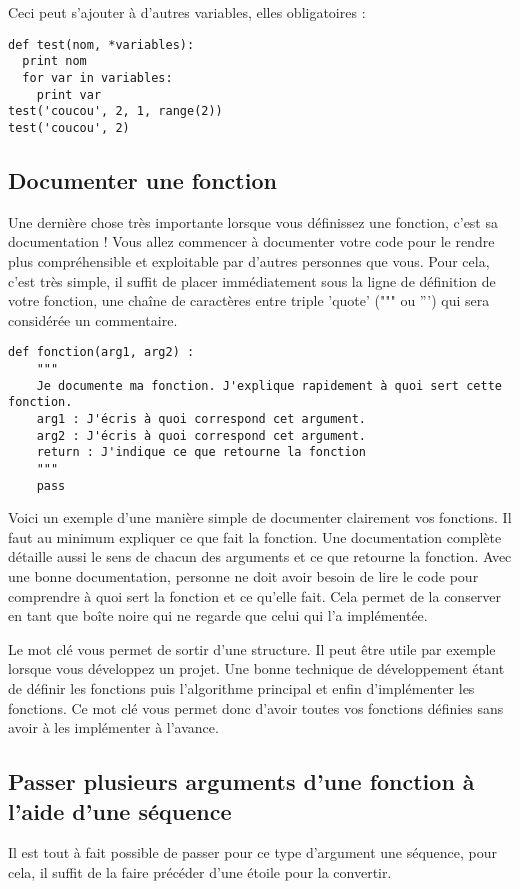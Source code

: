 \documentclass[a4paper,twoside]{article}
\begin{document}
Ceci peut s'ajouter à d'autres variables, elles obligatoires :
\begin{verbatim}
def test(nom, *variables):
  print nom
  for var in variables:
    print var
test('coucou', 2, 1, range(2))
test('coucou', 2)
\end{verbatim}

\subsection{Documenter une fonction}

Une dernière chose très importante lorsque vous définissez une fonction, c'est sa documentation ! Vous allez commencer à documenter votre code pour le rendre plus compréhensible et exploitable par d'autres personnes que vous. Pour cela, c'est très simple, il suffit de placer immédiatement sous la ligne de définition de votre fonction, une chaîne de caractères entre triple 'quote' (""" ou ''') qui sera considérée un commentaire.

\begin{verbatim}
def fonction(arg1, arg2) :
    """
    Je documente ma fonction. J'explique rapidement à quoi sert cette fonction.
    arg1 : J'écris à quoi correspond cet argument.
    arg2 : J'écris à quoi correspond cet argument.
    return : J'indique ce que retourne la fonction
    """
    pass
\end{verbatim}

Voici un exemple d'une manière simple de documenter clairement vos fonctions. Il faut au minimum expliquer ce que fait la fonction. Une documentation complète détaille aussi le sens de chacun des arguments et ce que retourne la fonction. Avec une bonne documentation, personne ne doit avoir besoin de lire le code pour comprendre à quoi sert la fonction et ce qu'elle fait. Cela permet de la conserver en tant que boîte noire qui ne regarde que celui qui l'a implémentée.

\begin{remarque}
Le mot clé  vous permet de sortir d'une structure. Il peut être utile par exemple lorsque vous développez un projet. Une bonne technique de développement étant de définir les fonctions puis l'algorithme principal et enfin d'implémenter les fonctions. Ce mot clé vous permet donc d'avoir toutes vos fonctions définies sans avoir à les implémenter à l'avance.
\end{remarque}

\subsection{Passer plusieurs arguments d'une fonction à l'aide d'une séquence}\label{sec:args_liste}
Il est tout à fait possible de passer pour ce type d'argument une séquence, pour cela, il suffit de la faire précéder d'une étoile pour la convertir.
\end{document}
